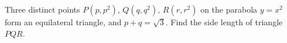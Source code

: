 Three distinct points $P\left(p,p^2\right)$, $Q\left(q,q^2\right)$, $R\left(r,r^2\right)$ on the parabola $y=x^2$ form an equilateral triangle, and $p+q=\sqrt3$. Find the side length of triangle $PQR$.
